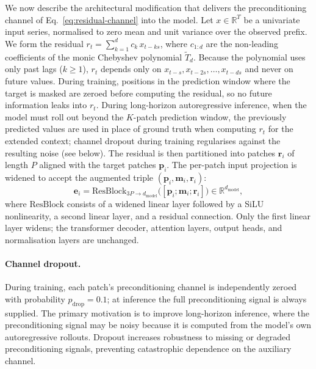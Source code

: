 \documentclass[11pt]{article}
\theoremstyle{plain}
\theoremstyle{definition}
\theoremstyle{remark}
\newcommand{\R}{\mathbb{R}}
\begin{document}
We now describe the architectural modification that delivers the preconditioning channel of Eq.~\eqref{eq:residual-channel} into the model. Let $x \in \R^T$ be a univariate input series, normalised to zero mean and unit variance over the observed prefix. We form the residual $r_t = \sum_{k=1}^{d} c_k\, x_{t-ks}$, where $c_{1:d}$ are the non-leading coefficients of the monic Chebyshev polynomial $\tilde T_d$. Because the polynomial uses only past lags ($k \geq 1$), $r_t$ depends only on $x_{t-s}, x_{t-2s}, \ldots, x_{t-ds}$ and never on future values. During training, positions in the prediction window where the target is masked are zeroed before computing the residual, so no future information leaks into $r_t$. During long-horizon autoregressive inference, when the model must roll out beyond the $K$-patch prediction window, the previously predicted values are used in place of ground truth when computing $r_t$ for the extended context; channel dropout during training regularises against the resulting noise (see below). The residual is then partitioned into patches $\mathbf{r}_i$ of length $P$ aligned with the target patches $\mathbf{p}_i$. The per-patch input projection is widened to accept the augmented triple $(\mathbf{p}_i, \mathbf{m}_i, \mathbf{r}_i)$:
\begin{equation}
    \mathbf{e}_i = \mathrm{ResBlock}_{3P \to d_{\text{model}}}\bigl([\mathbf{p}_i; \mathbf{m}_i; \mathbf{r}_i]\bigr) \in \R^{d_{\text{model}}},
    \label{eq:method-projection}
\end{equation}
where $\mathrm{ResBlock}$ consists of a widened linear layer followed by a SiLU nonlinearity, a second linear layer, and a residual connection. Only the first linear layer widens; the transformer decoder, attention layers, output heads, and normalisation layers are unchanged.

\paragraph{Channel dropout.}
During training, each patch's preconditioning channel is independently zeroed with probability $p_{\text{drop}} = 0.1$; at inference the full preconditioning signal is always supplied. The primary motivation is to improve long-horizon inference, where the preconditioning signal may be noisy because it is computed from the model's own autoregressive rollouts. Dropout increases robustness to missing or degraded preconditioning signals, preventing catastrophic dependence on the auxiliary channel.
\end{document}
